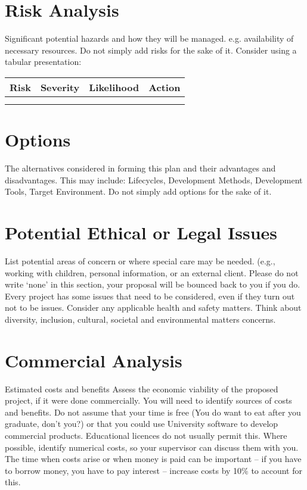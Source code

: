 \documentclass[a4paper,11pt]{techplan}
\begin{document}
\section*{Risk Analysis}
Significant potential hazards and how they will be managed. e.g. availability of necessary resources.  Do not simply add risks for the sake of it.  Consider using a tabular presentation:

\begin{center}
    \begin{tabularx}{\textwidth}{|X|X|X|X|}
    \hline
    \textbf{Risk} & \textbf{Severity} & \textbf{Likelihood} & \textbf{Action} \\[1ex]
    \hline
    & & & \\
    \hline
    & & & \\
    \hline
    \end{tabularx}
\end{center}

\section*{Options}

The alternatives considered in forming this plan and their advantages and disadvantages.  This may include:
Lifecycles, Development Methods, Development Tools, Target Environment.
Do not simply add options for the sake of it.

\section*{Potential Ethical or Legal Issues}

List potential areas of concern or where special care may be needed. (e.g., working with children, personal information, or an external client. Please do not write ‘none’ in this section, your proposal will be bounced back to you if you do. Every project has some issues that need to be considered, even if they turn out not to be issues. Consider any applicable health and safety matters. Think about diversity, inclusion, cultural, societal and environmental matters concerns.

\section*{Commercial Analysis}

Estimated costs and benefits
Assess the economic viability of the proposed project, if it were done commercially. You will need to identify sources of costs and benefits. Do not assume that your time is free (You do want to eat after you graduate, don’t you?) or that you could use University software to develop commercial products. Educational licences do not usually permit this. Where possible, identify numerical costs, so your supervisor can discuss them with you. The time when costs arise or when money is paid can be important – if you have to borrow money, you have to pay interest – increase costs by 10\% to account for this.
\end{document}
